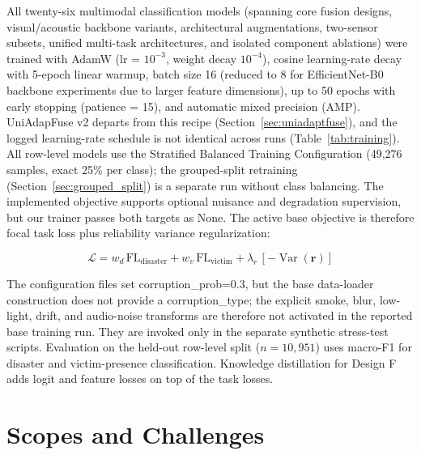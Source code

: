 All twenty-six multimodal classification models (spanning core fusion designs, visual/acoustic backbone variants, architectural augmentations, two-sensor subsets, unified multi-task architectures, and isolated component ablations) were trained with AdamW (lr = $10^{-3}$, weight decay $10^{-4}$), cosine learning-rate decay with 5-epoch linear warmup, batch size 16 (reduced to 8 for EfficientNet-B0 backbone experiments due to larger feature dimensions), up to 50 epochs with early stopping (patience = 15), and automatic mixed precision (AMP). UniAdapFuse v2 departs from this recipe (Section~\ref{sec:uniadaptfuse}), and the logged learning-rate schedule is not identical across runs (Table~\ref{tab:training}). All row-level models use the Stratified Balanced Training Configuration (49{,}276 samples, exact 25\% per class); the grouped-split retraining (Section~\ref{sec:grouped_split}) is a separate run without class balancing. The implemented objective supports optional nuisance and degradation supervision, but our trainer passes both targets as None. The active base objective is therefore focal task loss plus reliability variance regularization:

\begin{equation}
    \mathcal{L} = w_d\,\text{FL}_{\text{disaster}} + w_v\,\text{FL}_{\text{victim}} + \lambda_r\,[-\operatorname{Var}(\mathbf{r})]
\end{equation}

The configuration files set corruption\_prob=0.3, but the base data-loader construction does not provide a corruption\_type; the explicit smoke, blur, low-light, drift, and audio-noise transforms are therefore not activated in the reported base training run. They are invoked only in the separate synthetic stress-test scripts. Evaluation on the held-out row-level split ($n=10{,}951$) uses macro-F1 for disaster and victim-presence classification. Knowledge distillation for Design F adds logit and feature losses on top of the task losses.

\section{Scopes and Challenges}

